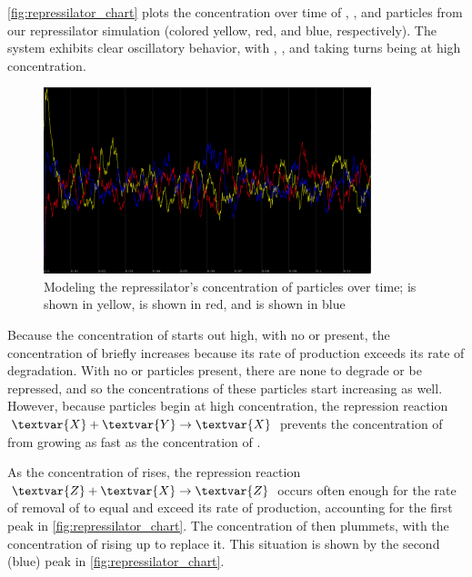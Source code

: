 \autoref{fig:repressilator_chart} plots the concentration over time of , , and  particles from our repressilator simulation (colored yellow, red, and blue, respectively). The system exhibits clear oscillatory behavior, with , , and  taking turns being at high concentration.\\

\begin{qbox}\end{qbox}

\begin{figure}[h]
\centering
\mySfFamily
\includegraphics[width = 0.85\textwidth]{../images/repressilator_chart_2.png}
\caption{Modeling the repressilator's concentration of particles over time;  is shown in yellow,  is shown in red, and  is shown in blue}
\label{fig:repressilator_chart}
\end{figure}

Because the concentration of  starts out high, with no  or  present, the concentration of  briefly increases because its rate of production exceeds its rate of degradation. With no  or  particles present, there are none to degrade or be repressed, and so the concentrations of these particles start increasing as well. However, because  particles begin at high concentration, the repression reaction $\textvar{X} + \textvar{Y} \rightarrow \textvar{X}$ prevents the concentration of  from growing as fast as the concentration of .

As the concentration of  rises, the repression reaction $\textvar{Z} + \textvar{X} \rightarrow \textvar{Z}$ occurs often enough for the rate of removal of  to equal and exceed its rate of production, accounting for the first peak in \autoref{fig:repressilator_chart}. The concentration of  then plummets, with the concentration of  rising up to replace it. This situation is shown by the second (blue) peak in \autoref{fig:repressilator_chart}.

